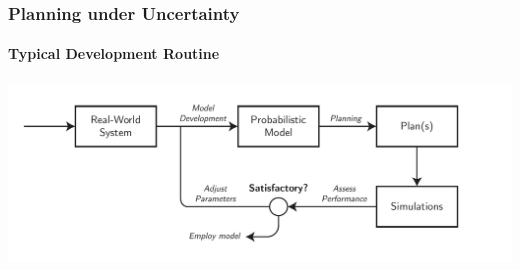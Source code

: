 
\begin{frame}
	\frametitle{Planning under Uncertainty}
	\framesubtitle{Typical Development Routine}
	\centering
	\includegraphics[width=\textwidth]{figures/high-level-planning-diagram}
\end{frame}

